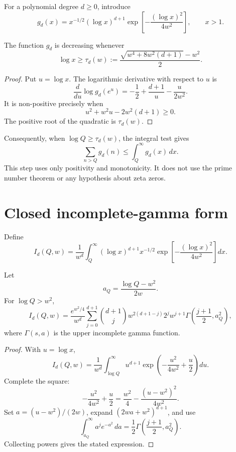 For a polynomial degree $d\ge0$, introduce
\[
 g_d(x)
 =
 x^{-1/2}(\log x)^{d+1}
 \exp\!\left[-\frac{(\log x)^2}{4w^2}\right],
 \qquad x>1.
\]

\begin{lemma}
\label{lem:tail-monotonicity}
The function $g_d$ is decreasing whenever
\[
 \log x\ge
 \tau_d(w)
 :=
 \frac{\sqrt{w^4+8w^2(d+1)}-w^2}{2}.
\]
\end{lemma}

\begin{proof}
Put $u=\log x$. The logarithmic derivative with respect to $u$ is
\[
 \frac{d}{du}\log g_d(e^u)
 =
 -\frac12+\frac{d+1}{u}-\frac{u}{2w^2}.
\]
It is non-positive precisely when
\[
 u^2+w^2u-2w^2(d+1)\ge0.
\]
The positive root of the quadratic is $\tau_d(w)$.
\end{proof}

Consequently, when $\log Q\ge\tau_d(w)$, the integral test gives
\[
 \sum_{n>Q}g_d(n)
 \le
 \int_Q^\infty g_d(x)\,dx.
\]
This step uses only positivity and monotonicity. It does not use the prime
number theorem or any hypothesis about zeta zeros.

\section{Closed incomplete-gamma form}

Define
\[
 I_d(Q,w)
 =
 \frac1{w^d}
 \int_Q^\infty
 (\log x)^{d+1}x^{-1/2}
 \exp\!\left[-\frac{(\log x)^2}{4w^2}\right]dx.
\]

\begin{theorem}
\label{thm:tail-gamma}
Let
\[
 a_Q=\frac{\log Q-w^2}{2w}.
\]
For $\log Q>w^2$,
\[
 I_d(Q,w)
 =
 \frac{e^{w^2/4}}{w^d}
 \sum_{j=0}^{d+1}
 \binom{d+1}{j}
 w^{2(d+1-j)}
 2^j w^{j+1}
 \Gamma\!\left(\frac{j+1}{2},a_Q^2\right),
\]
where $\Gamma(s,a)$ is the upper incomplete gamma function.
\end{theorem}

\begin{proof}
With $u=\log x$,
\[
 I_d(Q,w)
 =
 \frac1{w^d}
 \int_{\log Q}^{\infty}
 u^{d+1}
 \exp\!\left(-\frac{u^2}{4w^2}+\frac u2\right)du.
\]
Complete the square:
\[
 -\frac{u^2}{4w^2}+\frac u2
 =
 \frac{w^2}{4}
 -
 \frac{(u-w^2)^2}{4w^2}.
\]
Set $a=(u-w^2)/(2w)$, expand
$(2wa+w^2)^{d+1}$, and use
\[
 \int_{a_Q}^{\infty}a^j e^{-a^2}\,da
 =
 \frac12\Gamma\!\left(\frac{j+1}{2},a_Q^2\right).
\]
Collecting powers gives the stated expression.
\end{proof}

